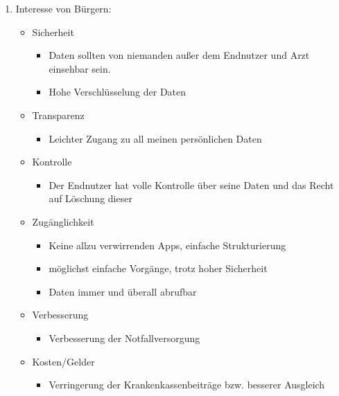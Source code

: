 \documentclass[a4paper]{assignment}
\begin{document}
\begin{problemlist}
\begin{enumerate}

\item Interesse von Bürgern:

\begin{itemize}

\item Sicherheit
\begin{itemize}
	\item Daten sollten von niemanden außer dem Endnutzer und Arzt einsehbar sein.
	\item Hohe Verschlüsselung der Daten
\end{itemize}

\item Transparenz
\begin{itemize}
	\item Leichter Zugang zu all meinen persönlichen Daten
\end{itemize}

\item Kontrolle
\begin{itemize}
	\item Der Endnutzer hat volle Kontrolle über seine Daten und das Recht auf Löschung dieser
\end{itemize}

\item Zugänglichkeit
\begin{itemize}
	\item Keine allzu verwirrenden Apps, einfache Strukturierung
	\item möglichst einfache Vorgänge, trotz hoher Sicherheit
	\item Daten immer und überall abrufbar
\end{itemize}

\item Verbesserung
\begin{itemize}
	\item Verbesserung der Notfallversorgung
\end{itemize}

\item Kosten/Gelder
\begin{itemize}
	\item Verringerung der Krankenkassenbeiträge bzw. besserer Ausgleich
\end{itemize}
\end{itemize}



\end{enumerate}
\end{problemlist}
\end{document}
